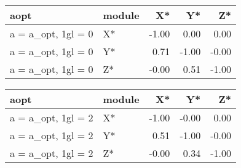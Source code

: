 \documentclass[10pt,a4paper]{article}
\begin{document}
\begin{table}[ht]
\centering
\begin{tabular}{llrrr}
  \hline
aopt & module & X* & Y* & Z* \\ 
  \hline
a = a\_opt, 1gl = 0 & X* & -1.00 & 0.00 & 0.00 \\ 
  a = a\_opt, 1gl = 0 & Y* & 0.71 & -1.00 & -0.00 \\ 
  a = a\_opt, 1gl = 0 & Z* & -0.00 & 0.51 & -1.00 \\ 
   \hline
\end{tabular}
\end{table}


\begin{table}[ht]
\centering
\begin{tabular}{llrrr}
  \hline
aopt & module & X* & Y* & Z* \\ 
  \hline
a = a\_opt, 1gl = 2 & X* & -1.00 & -0.00 & 0.00 \\ 
  a = a\_opt, 1gl = 2 & Y* & 0.51 & -1.00 & -0.00 \\ 
  a = a\_opt, 1gl = 2 & Z* & -0.00 & 0.34 & -1.00 \\ 
   \hline
\end{tabular}
\end{table}
 
\end{document}
